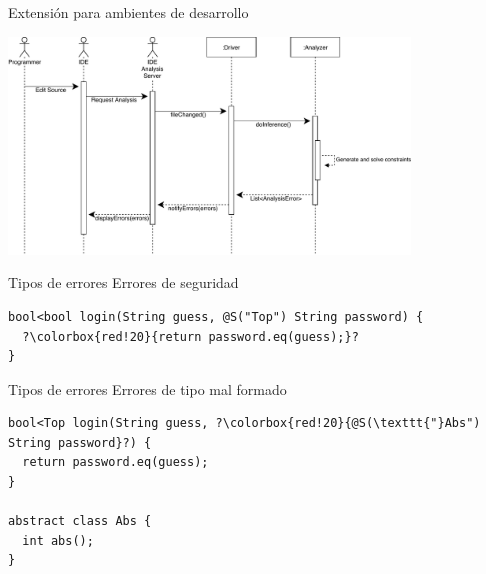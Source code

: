 \documentclass[aspectratio=169,10pt]{beamer}
\begin{document}

\begin{frame}[fragile]{Extensión para ambientes de desarrollo}
	\begin{center}
		\includegraphics[width=0.8\textwidth]{images/sequence.pdf}
	\end{center}
\end{frame}

\begin{frame}[fragile]{Tipos de errores}
	Errores de seguridad \\ \pause
	\vspace{1cm}
\begin{lstlisting}[escapechar=?,basicstyle=\fontsize{9}{9}\ttfamily]
bool<bool login(String guess, @S("Top") String password) {
  ?\colorbox{red!20}{return password.eq(guess);}?
}
\end{lstlisting}
\end{frame}

\begin{frame}[fragile]{Tipos de errores}
	Errores de tipo mal formado \\ \pause
	\vspace{1cm}
\begin{lstlisting}[escapechar=?,basicstyle=\fontsize{9}{9}\ttfamily]
bool<Top login(String guess, ?\colorbox{red!20}{@S(\texttt{"}Abs") String password}?) {
  return password.eq(guess);
}

abstract class Abs {
  int abs();
}
\end{lstlisting}
\end{frame}
\end{document}
